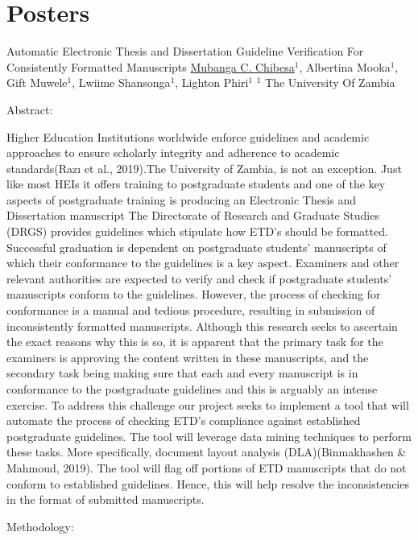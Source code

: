\section{Posters}
\begin{abstract_online}{Automatic Electronic Thesis and Dissertation Guideline Verification For Consistently Formatted Manuscripts}{%
    \underline{Mubanga C. Chibesa}$^{1}$, Albertina Mooka$^{1}$, Gift Muwele$^{1}$, Lwiime Shansonga$^{1}$, Lighton Phiri$^{1}$}{%
    }{%
    $^1$ The University Of Zambia}

Abstract:

Higher Education Institutions worldwide enforce guidelines and academic approaches to ensure scholarly integrity and adherence to academic standards(Razı et al., 2019).The University of Zambia, is not an exception. Just like most HEIs it offers  training to postgraduate students and one of the key aspects of postgraduate training is producing an Electronic Thesis and Dissertation manuscript The Directorate of Research and Graduate Studies (DRGS) provides guidelines which stipulate how ETD’s should be formatted. Successful graduation is dependent on postgraduate students’ manuscripts of which their conformance to the guidelines is a key aspect. Examiners and other relevant authorities are expected to verify and check if postgraduate students' manuscripts conform to the guidelines.
However, the process of  checking for conformance is a manual and tedious procedure, resulting in submission of inconsistently formatted manuscripts. Although this research seeks to ascertain the exact reasons why this is so, it is apparent that the primary task for the examiners is approving the content written in these manuscripts, and the secondary task being making sure that each and every manuscript is in conformance to the postgraduate guidelines and this is arguably an intense exercise. To address this challenge our  project seeks to implement a tool that will automate the process of checking ETD’s compliance against established postgraduate guidelines. The tool will leverage data mining techniques to perform these tasks. More specifically, document layout analysis (DLA)(Binmakhashen \& Mahmoud, 2019). The tool will flag off portions of ETD manuscripts that do not  conform to established guidelines. Hence, this will help resolve the inconsistencies in the format of submitted manuscripts. 

Methodology:


\end{abstract_online}

